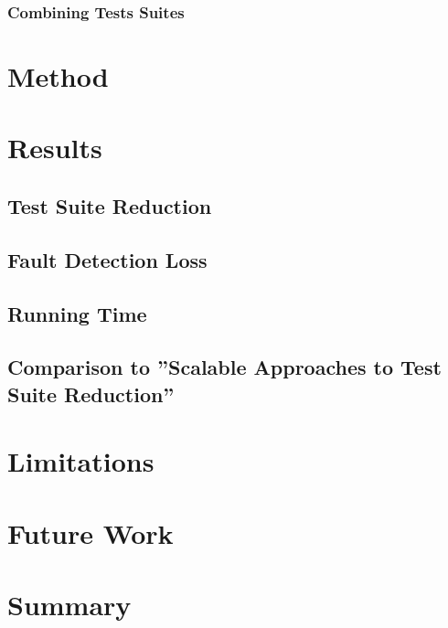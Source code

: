 \documentclass[a4paper,10pt]{article}
\begin{document}

\subsubsection{Combining Tests Suites}

\section{Method}

\section{Results}

\subsection{Test Suite Reduction}

\subsection{Fault Detection Loss}

\subsection{Running Time}

\subsection{Comparison to ''Scalable Approaches to Test Suite Reduction''}

\section{Limitations}

\section{Future Work}

\section{Summary}

\newpage



\end{document}
